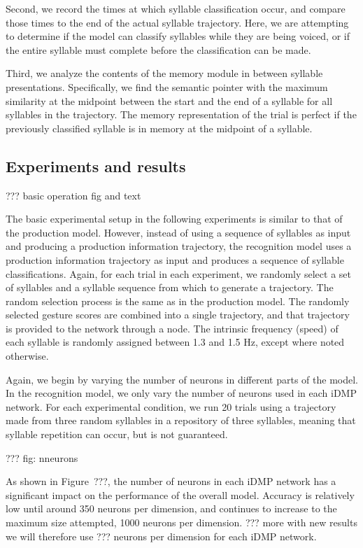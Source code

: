 Second, we record the times at which
syllable classification occur,
and compare those times
to the end of the actual syllable trajectory.
Here, we are attempting to determine
if the model can classify syllables
while they are being voiced,
or if the entire syllable must complete
before the classification can be made.

Third, we analyze the contents
of the memory module
in between syllable presentations.
Specifically,
we find the semantic pointer
with the maximum similarity
at the midpoint between
the start and the end of a syllable
for all syllables in the trajectory.
The memory representation of the trial
is perfect if the
previously classified syllable
is in memory at the midpoint
of a syllable.

\subsection{Experiments and results}

??? basic operation fig and text

The basic experimental setup
in the following experiments
is similar to that of the production model.
However, instead of using
a sequence of syllables
as input and producing
a production information trajectory,
the recognition model
uses a production information trajectory
as input and produces
a sequence of syllable classifications.
Again, for each trial in each experiment,
we randomly select a set of syllables
and a syllable sequence
from which to generate a trajectory.
The random selection process
is the same as in the production model.
The randomly selected
gesture scores are combined
into a single trajectory,
and that trajectory
is provided to the network
through a node.
The intrinsic frequency (speed)
of each syllable is randomly assigned
between 1.3 and 1.5 Hz, %
except where noted otherwise.

Again, we begin by varying the number of neurons
in different parts of the model.
In the recognition model,
we only vary the number of neurons
used in each iDMP network.
For each experimental condition,
we run 20 trials using
a trajectory made from
three random syllables
in a repository of three syllables,
meaning that syllable repetition can occur,
but is not guaranteed.

??? fig: nneurons

As shown in Figure~???,
the number of neurons in each iDMP network
has a significant impact on the performance
of the overall model.
Accuracy is relatively low
until around 350 neurons per dimension,
and continues to increase
to the maximum size attempted,
1000 neurons per dimension.
??? more with new results
we will therefore
use ??? neurons per dimension
for each iDMP network.

